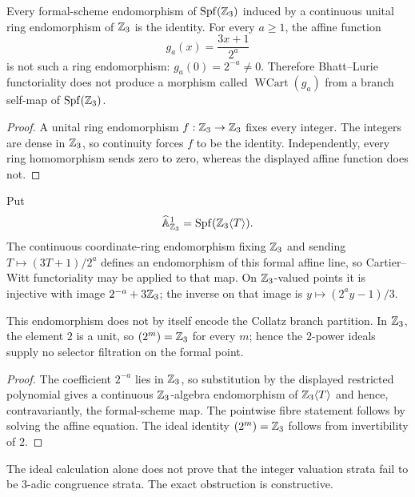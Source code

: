 \begin{proposition}
\label{prop:symbolic-WCart-formal-map-obstruction}
Every formal-scheme endomorphism of $\operatorname{Spf}(\mathbb{Z}_3)$ induced by a
continuous unital ring endomorphism of $\mathbb{Z}_3$ is the identity.  For every
$a\geq1$, the affine function
\[
 g_a(x)=\frac{3x+1}{2^a}
\]
is not such a ring endomorphism: $g_a(0)=2^{-a}\ne0$.  Therefore Bhatt--Lurie
functoriality does not produce a morphism called
$\operatorname{WCart}(g_a)$ from a branch self-map of
$\operatorname{Spf}(\mathbb{Z}_3)$.
\end{proposition}

\begin{proof}
A unital ring endomorphism $f:\mathbb{Z}_3\to\mathbb{Z}_3$ fixes every integer.  The
integers are dense in $\mathbb{Z}_3$, so continuity forces $f$ to be the identity.
Independently, every ring homomorphism sends zero to zero, whereas the
displayed affine function does not.
\end{proof}

\begin{proposition}
\label{prop:symbolic-formal-affine-line-repair}
Put
\[
 \widehat{\mathbb A}^1_{\mathbb{Z}_3}
 =\operatorname{Spf}(\mathbb{Z}_3\langle T\rangle).
\]
The continuous coordinate-ring endomorphism fixing $\mathbb{Z}_3$ and sending
$T\mapsto(3T+1)/2^a$ defines an endomorphism of this formal affine line, so
Cartier--Witt functoriality may be applied to that map.  On $\mathbb{Z}_3$-valued
points it is injective with image $2^{-a}+3\mathbb{Z}_3$; the inverse on that image
is $y\mapsto(2^ay-1)/3$.

This endomorphism does not by itself encode the Collatz branch partition.  In
$\mathbb{Z}_3$, the element $2$ is a unit, so $(2^m)=\mathbb{Z}_3$ for every $m$; hence the
$2$-power ideals supply no selector filtration on the formal point.
\end{proposition}

\begin{proof}
The coefficient $2^{-a}$ lies in $\mathbb{Z}_3$, so substitution by the displayed
restricted polynomial gives a continuous $\mathbb{Z}_3$-algebra endomorphism of
$\mathbb{Z}_3\langle T\rangle$ and hence, contravariantly, the formal-scheme map.
The pointwise fibre statement follows by solving the affine equation.  The
ideal identity $(2^m)=\mathbb{Z}_3$ follows from invertibility of $2$.
\end{proof}

The ideal calculation alone does not prove that the integer valuation strata
fail to be $3$-adic congruence strata.  The exact obstruction is constructive.


